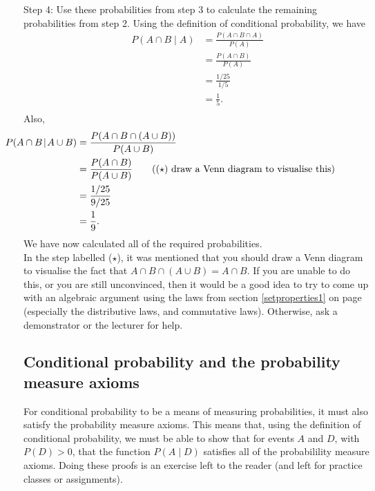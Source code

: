 Step 4: Use these probabilities from step 3 to calculate the remaining probabilities from step 2. Using the definition of conditional probability, we have \\
\begin{align*}
P(A \cap B \! \mid \! A) & = \frac{P(A \cap B \cap A)}{P(A)} \\
				   & = \frac{P(A \cap B)}{P(A)} \tag{since $A \cap B \cap A = A \cap A \cap B = A \cap B$, as $A \cap A = A$} \\
				   & = \frac{1/25}{1/5} \tag{using results from step 3} \\
				   & = \frac{1}{5}. \\
\end{align*}
Also,
\begin{align*}
\hspace{-2cm} P(A \cap B \! \mid \! A \cup B) & = \frac{P(A \cap B \cap (A \cup B))}{P(A \cup B)} \\
					     & = \frac{P(A \cap B)}{P(A \cup B)} \tag{($\star$) draw a Venn diagram to visualise this} \\
					     & = \frac{1/25}{9/25} \\
					     & = \frac{1}{9}.
\end{align*}
We have now calculated all of the required probabilities. \\

\noindent In the step labelled ($\star$), it was mentioned that you should draw a Venn diagram to visualise the fact that $A \cap B \cap (A \cup B) = A \cap B$. If you are unable to do this, or you are still unconvinced, then it would be a good idea to try to come up with an algebraic argument using the laws from section \ref{setproperties1} on page \pageref{setproperties1} (especially the distributive laws, and commutative laws). Otherwise, ask a demonstrator or the lecturer for help.

\subsection{Conditional probability and the probability measure axioms}
For conditional probability to be a means of measuring probabilities, it must also satisfy the probability measure axioms. This means that, using the definition of conditional probability, we must be able to show that for events $A$ and $D$, with $P(D) > 0$, that the function $P(A \! \mid \! D)$ satisfies all of the probabilility measure axioms. Doing these proofs is an exercise left to the reader (and left for practice classes or assignments). \\

